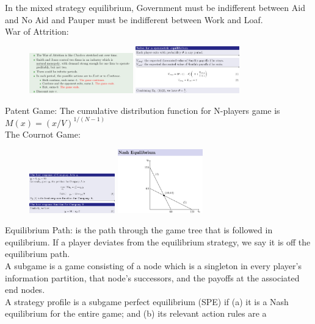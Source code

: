\documentclass{article}
\begin{document}
In the mixed strategy equilibrium, Government must be indifferent between
Aid and No Aid and Pauper must be indifferent between Work and Loaf.\\
War of Attrition:\\
\begin{figure}[H]
\includegraphics[width=0.4\textwidth]{attrition.png}
\includegraphics[width=0.4\textwidth]{attrition2.png}
\end{figure}
Patent Game: The cumulative distribution function for N-players game is $M(x) = (x/V)^{1/(N-1)}$\\
The Cournot Game:\\
\begin{figure}[H]
\includegraphics[width=0.33\textwidth]{cournot.png}
\includegraphics[width=0.33\textwidth]{cournot2.png}
\end{figure}
Equilibrium Path: is the path through the game tree that is followed in equilibrium. If a player deviates from the equilibrium strategy,
we say it is off the equilibrium path.\\
A subgame is a game consisting of a node which is a singleton in every
player’s information partition, that node’s successors, and the payoffs at the
associated end nodes.\\
A strategy profile is a subgame perfect equilibrium (SPE) if (a) it is a
Nash equilibrium for the entire game; and (b) its relevant action rules are a
\end{document}
